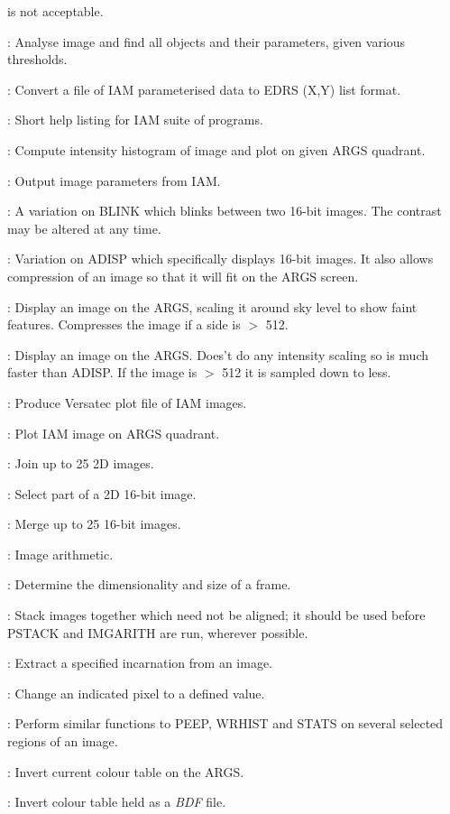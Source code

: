 \begin{description}
is not acceptable.
\item [IAMANAL]: Analyse image and find all objects and their parameters, given
various thresholds.
\item [IAMEDRS]: Convert a file of IAM parameterised data to EDRS (X,Y) list
format.
\item [IAMHELP]: Short help listing for IAM suite of programs.
\item [IAMHIS*]: Compute intensity histogram of image and plot on given ARGS
quadrant.
\item [IAMPR]: Output image parameters from IAM.
\item [ICBLINK]: A variation on BLINK which blinks between two 16-bit images.
The contrast may be altered at any time.
\item [ICDISP]: Variation on ADISP which specifically displays 16-bit images.
It also allows compression of an image so that it will fit on the ARGS screen.
\item [ICFLASH]: Display an image on the ARGS, scaling it around sky level to
show faint features.
Compresses the image if a side is $>$ 512.
\item [IFLASH]: Display an image on the ARGS.
Does't do any intensity scaling so is much faster than ADISP.
If the image is $>$ 512 it is sampled down to less.
\item [IGJOB]: Produce Versatec plot file of IAM images.
\item [IGPLOT]: Plot IAM image on ARGS quadrant.
\item [IJOIN]: Join up to 25 2D images.
\item [IMANIC]: Select part of a 2D 16-bit image.
\item [IMERGE]: Merge up to 25 16-bit images.
\item [IMGARITH]: Image arithmetic.
\item [IMSIZE]: Determine the dimensionality and size of a frame.
\item [IMSTACK]: Stack images together which need not be aligned; it should be
used before PSTACK and IMGARITH are run, wherever possible.
\item [INCARN]: Extract a specified incarnation from an image.
\item [INDPIX*]: Change an indicated pixel to a defined value.
\item [INSPECT]: Perform similar functions to PEEP, WRHIST and STATS on several
selected regions of an image.
\item [INVARG]: Invert current colour table on the ARGS.
\item [INVCOL]: Invert colour table held as a {\em BDF} file.

\end{description}
